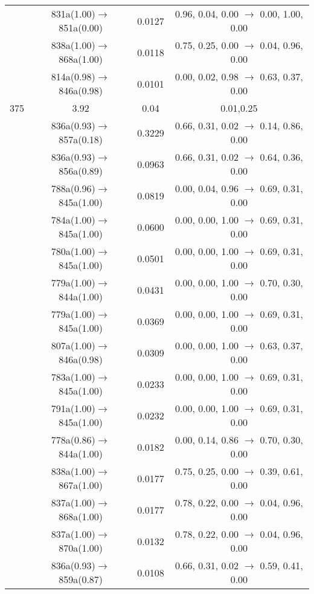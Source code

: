 \documentclass[10pt,a4paper]{article}
\begin{document}
\begin{longtable}{c|c|c|c}
 	& 831a(1.00)$\rightarrow$851a(0.00) &	 0.0127 &	 0.96, 0.04, 0.00 $\rightarrow$ 0.00, 1.00, 0.00 \\ 
 	& 838a(1.00)$\rightarrow$868a(1.00) &	 0.0118 &	 0.75, 0.25, 0.00 $\rightarrow$ 0.04, 0.96, 0.00 \\ 
 	& 814a(0.98)$\rightarrow$846a(0.98) &	 0.0101 &	 0.00, 0.02, 0.98 $\rightarrow$ 0.63, 0.37, 0.00 \\ 
 \hline375 &	 3.92 &	 0.04 &	 0.01,0.25 \\ 
  	& 836a(0.93)$\rightarrow$857a(0.18) &	 0.3229 &	 0.66, 0.31, 0.02 $\rightarrow$ 0.14, 0.86, 0.00 \\ 
 	& 836a(0.93)$\rightarrow$856a(0.89) &	 0.0963 &	 0.66, 0.31, 0.02 $\rightarrow$ 0.64, 0.36, 0.00 \\ 
 	& 788a(0.96)$\rightarrow$845a(1.00) &	 0.0819 &	 0.00, 0.04, 0.96 $\rightarrow$ 0.69, 0.31, 0.00 \\ 
 	& 784a(1.00)$\rightarrow$845a(1.00) &	 0.0600 &	 0.00, 0.00, 1.00 $\rightarrow$ 0.69, 0.31, 0.00 \\ 
 	& 780a(1.00)$\rightarrow$845a(1.00) &	 0.0501 &	 0.00, 0.00, 1.00 $\rightarrow$ 0.69, 0.31, 0.00 \\ 
 	& 779a(1.00)$\rightarrow$844a(1.00) &	 0.0431 &	 0.00, 0.00, 1.00 $\rightarrow$ 0.70, 0.30, 0.00 \\ 
 	& 779a(1.00)$\rightarrow$845a(1.00) &	 0.0369 &	 0.00, 0.00, 1.00 $\rightarrow$ 0.69, 0.31, 0.00 \\ 
 	& 807a(1.00)$\rightarrow$846a(0.98) &	 0.0309 &	 0.00, 0.00, 1.00 $\rightarrow$ 0.63, 0.37, 0.00 \\ 
 	& 783a(1.00)$\rightarrow$845a(1.00) &	 0.0233 &	 0.00, 0.00, 1.00 $\rightarrow$ 0.69, 0.31, 0.00 \\ 
 	& 791a(1.00)$\rightarrow$845a(1.00) &	 0.0232 &	 0.00, 0.00, 1.00 $\rightarrow$ 0.69, 0.31, 0.00 \\ 
 	& 778a(0.86)$\rightarrow$844a(1.00) &	 0.0182 &	 0.00, 0.14, 0.86 $\rightarrow$ 0.70, 0.30, 0.00 \\ 
 	& 838a(1.00)$\rightarrow$867a(1.00) &	 0.0177 &	 0.75, 0.25, 0.00 $\rightarrow$ 0.39, 0.61, 0.00 \\ 
 	& 837a(1.00)$\rightarrow$868a(1.00) &	 0.0177 &	 0.78, 0.22, 0.00 $\rightarrow$ 0.04, 0.96, 0.00 \\ 
 	& 837a(1.00)$\rightarrow$870a(1.00) &	 0.0132 &	 0.78, 0.22, 0.00 $\rightarrow$ 0.04, 0.96, 0.00 \\ 
 	& 836a(0.93)$\rightarrow$859a(0.87) &	 0.0108 &	 0.66, 0.31, 0.02 $\rightarrow$ 0.59, 0.41, 0.00 \\ 

\end{longtable}
\end{document}
